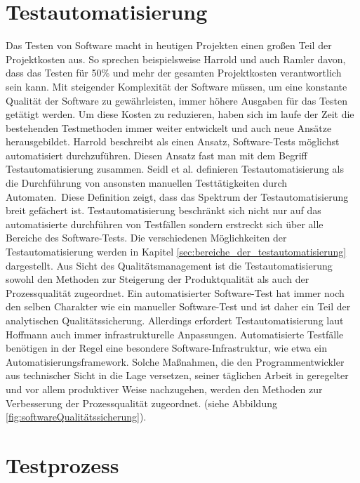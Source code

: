 \section{Testautomatisierung}
\label{sec:testautoGrundlagen}
Das Testen von Software macht in heutigen Projekten einen großen Teil der Projektkosten aus. So sprechen beispielsweise Harrold \cite{harrold_testing:_2000} und auch Ramler \cite{ramler_economic_2006} davon, dass das Testen für 50\% 
und mehr der gesamten Projektkosten verantwortlich sein kann. 
Mit steigender Komplexität der Software müssen, um eine konstante Qualität der Software zu gewährleisten, immer höhere Ausgaben für das Testen getätigt werden.  
Um diese Kosten zu reduzieren, haben sich im laufe der Zeit die bestehenden Testmethoden immer weiter entwickelt und auch neue Ansätze herausgebildet. Harrold \cite{harrold_testing:_2000} beschreibt als einen Ansatz, Software-Tests möglichst automatisiert durchzuführen. Diesen Ansatz fast man mit dem Begriff Testautomatisierung zusammen.
Seidl et al. \cite[S.7]{seidl_basiswissen_2012} definieren Testautomatisierung als \glqq die Durchführung von ansonsten manuellen Testtätigkeiten durch Automaten.\grqq\
Diese Definition zeigt, dass das Spektrum der Testautomatisierung breit gefächert ist. Testautomatisierung beschränkt sich nicht nur auf das automatisierte durchführen von Testfällen sondern erstreckt sich über alle Bereiche des Software-Tests. Die verschiedenen Möglichkeiten der Testautomatisierung werden in Kapitel \ref{sec:bereiche_der_testautomatisierung} dargestellt.
Aus Sicht des Qualitätsmanagement ist die Testautomatisierung sowohl den Methoden zur Steigerung der Produktqualität als auch der Prozessqualität zugeordnet. Ein automatisierter Software-Test hat immer noch den selben Charakter wie ein manueller Software-Test und ist daher ein Teil der analytischen Qualitätssicherung. Allerdings erfordert Testautomatisierung laut Hoffmann \cite[vgl. Seite 25]{hoffmann_software-qualitat_2013} auch immer infrastrukturelle Anpassungen. Automatisierte Testfälle benötigen in der Regel eine besondere Software-Infrastruktur, wie etwa ein Automatisierungsframework. Solche Maßnahmen, die den Programmentwickler aus technischer Sicht in die Lage versetzen, seiner täglichen Arbeit in geregelter und vor allem produktiver Weise nachzugehen, werden den Methoden zur Verbesserung der Prozessqualität zugeordnet. (siehe Abbildung \ref{fig:softwareQualitätssicherung}).



\section{Testprozess}
\label{sec:testprozess}

